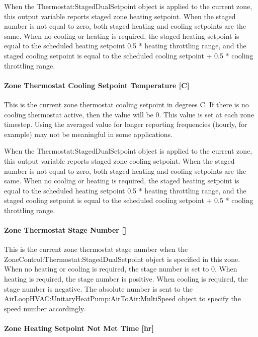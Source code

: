 When the Thermostat:StagedDualSetpoint object is applied to the current zone, this output variable reports staged zone heating setpoint. When the staged number is not equal to zero, both staged heating and cooling setpoints are the same. When no cooling or heating is required, the staged heating setpoint is equal to the scheduled heating setpoint 0.5 * heating throttling range, and the staged cooling setpoint is equal to the scheduled cooling setpoint + 0.5 * cooling throttling range.

\paragraph{Zone Thermostat Cooling Setpoint Temperature {[}C{]}}\label{zone-thermostat-cooling-setpoint-temperature-c}

This is the current zone thermostat cooling setpoint in degrees C. If there is no cooling thermostat active, then the value will be 0. This value is set at each zone timestep. Using the averaged value for longer reporting frequencies (hourly, for example) may not be meaningful in some applications.

When the Thermostat:StagedDualSetpoint object is applied to the current zone, this output variable reports staged zone cooling setpoint. When the staged number is not equal to zero, both staged heating and cooling setpoints are the same. When no cooling or heating is required, the staged heating setpoint is equal to the scheduled heating setpoint 0.5 * heating throttling range, and the staged cooling setpoint is equal to the scheduled cooling setpoint + 0.5 * cooling throttling range.

\paragraph{Zone Thermostat Stage Number {[]}}\label{zone-thermostat-stage-number}

This is the current zone thermostat stage number when the ZoneControl:Thermostat:StagedDualSetpoint object is specified in this zone. When no heating or cooling is required, the stage number is set to 0. When heating is required, the stage number is positive. When cooling is required, the stage number is negative. The absolute number is sent to the AirLoopHVAC:UnitaryHeatPump:AirToAir:MultiSpeed object to specify the speed number accordingly.

\paragraph{Zone Heating Setpoint Not Met Time {[}hr{]}}\label{zone-heating-setpoint-not-met-time-hr}

